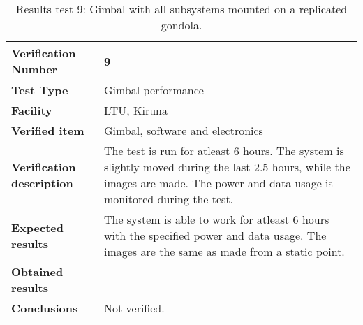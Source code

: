 \begin{table}[H]
\centering

\begin{tabular}{|m{}| m{} |}
\hline
\textbf{Verification Number} 		& 9 				\\ \hline
\textbf{Test Type} 					& Gimbal performance\\ \hline
\textbf{Facility} 					& LTU, Kiruna 		\\ \hline
\textbf{Verified item} 				& Gimbal, software and electronics \\ \hline

\textbf{Verification description} 	& The test is run for atleast 6 hours. The system is slightly moved during the last 2.5 hours, while the images are made. The power and data usage is monitored during the test. \\ \hline

\textbf{Expected results} 			& The system is able to work for atleast 6 hours with the specified power and data usage. The images are the same as made from a static point. \\ \hline

\textbf{Obtained results} 			& \\ \hline

\textbf{Conclusions} 				& Not verified.		\\ \hline
\end{tabular}
\caption{Results test 9: Gimbal with all subsystems mounted on a replicated gondola.}
\label{tab:testresult9:gimbal}
\end{table}


\raggedbottom